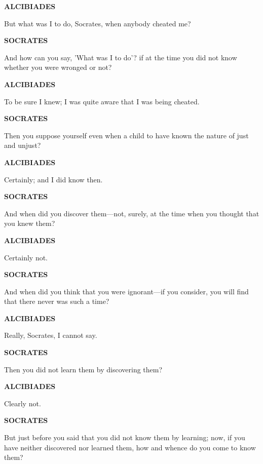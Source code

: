 \documentclass[11pt,letter]{article}
\begin{document}
\par \textbf{ALCIBIADES}
\par   But what was I to do, Socrates, when anybody cheated me?

\par \textbf{SOCRATES}
\par   And how can you say, 'What was I to do'? if at the time you did not know whether you were wronged or not?

\par \textbf{ALCIBIADES}
\par   To be sure I knew; I was quite aware that I was being cheated.

\par \textbf{SOCRATES}
\par   Then you suppose yourself even when a child to have known the nature of just and unjust?

\par \textbf{ALCIBIADES}
\par   Certainly; and I did know then.

\par \textbf{SOCRATES}
\par   And when did you discover them—not, surely, at the time when you thought that you knew them?

\par \textbf{ALCIBIADES}
\par   Certainly not.

\par \textbf{SOCRATES}
\par   And when did you think that you were ignorant—if you consider, you will find that there never was such a time?

\par \textbf{ALCIBIADES}
\par   Really, Socrates, I cannot say.

\par \textbf{SOCRATES}
\par   Then you did not learn them by discovering them?

\par \textbf{ALCIBIADES}
\par   Clearly not.

\par \textbf{SOCRATES}
\par   But just before you said that you did not know them by learning; now, if you have neither discovered nor learned them, how and whence do you come to know them?
\end{document}
